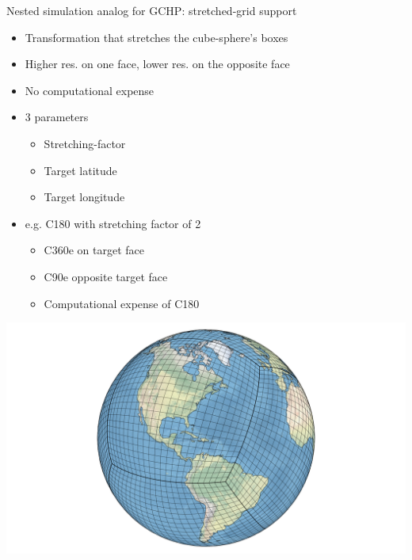 \documentclass[10pt]{beamer}
\begin{document}
\begin{frame}[fragile]{Nested simulation analog for GCHP: stretched-grid support}
    \begin{minipage}[c]{0.5\textwidth}
        \footnotesize
        \begin{itemize}
            \item Transformation that stretches the cube-sphere's boxes
            \item Higher res. on one face, lower res. on the opposite face
            \item No computational expense
            \item 3 parameters
            \begin{itemize}
                \footnotesize
                \item Stretching-factor
                \item Target latitude
                \item Target longitude
            \end{itemize}
            \item e.g. C180 with stretching factor of 2
            \begin{itemize}
                \footnotesize
                \item C360e on target face
                \item C90e opposite target face
                \item Computational expense of C180
            \end{itemize}
        \end{itemize}
    \end{minipage}
    \begin{minipage}[c]{0.48\textwidth}
        \begin{center}
            \includegraphics[height=0.3\textheight]{scs_1.png}

\end{center}
\end{minipage}
\end{frame}
\end{document}
